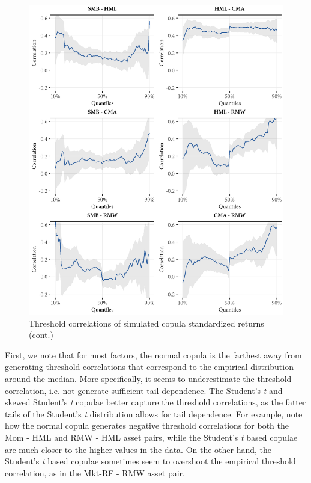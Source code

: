 \begin{figure}[!ht]
  \ContinuedFloat
  \centering

  \includegraphics[scale=1]{graphics/threshold_simulated2.png}  

  \caption{Threshold correlations of simulated copula standardized returns (cont.)}
\end{figure}

First, we note that for most factors, the normal copula is the farthest away from generating threshold correlations that correspond to the empirical distribution around the median. More specifically, it seems to underestimate the threshold correlation, i.e. not generate sufficient tail dependence. The Student's \textit{t} and skewed Student's \textit{t} copulae better capture the threshold correlations, as the fatter tails of the Student's \textit{t} distribution allows for tail dependence. For example, note how the normal copula generates negative threshold correlations for both the Mom - HML and RMW - HML asset pairs, while the Student's \textit{t} based copulae are much closer to the higher values in the data. On the other hand, the Student's \textit{t} based copulae sometimes seem to overshoot the empirical threshold correlation, as in the Mkt-RF - RMW asset pair.

